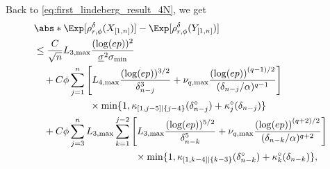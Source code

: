 \documentclass[aos]{imsart}
\begin{document}
\begin{appendix}
Back to \cref{eq:first_lindeberg_result_4N}, we get
\begin{equation*}
\begin{aligned}
    & \abs*{ \Exp[\rho_{r,\phi}^\delta(X_{[1,n]})] - \Exp[\rho_{r,\phi}^\delta(Y_{[1,n]})]} \\
    & \leq \frac{C}{\sqrt{n}} L_{3,\max} \frac{(\log(ep))^2}{\underline{\sigma}^2 \sigma_{\min}} \\
    & \quad + C \phi \sum_{j=1}^{n} \left[ 
        {L}_{4,\max} \frac{(\log(ep))^{3/2}}{\delta_{n-j}^3}
        + \nu_{q,\max} \frac{{(\log(ep))}^{(q-1)/2}}{(\delta_{n-j}/\alpha)^{q-1}}
    \right] \\
    & \quad \hspace{0.65in} \times \min\{1, \kappa_{[1,j-5]|\{j-4\}}(\delta_{n-j}^\circ) + \kappa^\circ_{j}(\delta_{n-j})\} \\
    & \quad + C \phi \sum_{j=3}^{n} 
    L_{3,\max} \sum_{k=1}^{j-2} \left[ 
        {L}_{3,\max} \frac{(\log(ep))^{5/2}}{\delta_{n-k}^5}
        + \nu_{q,\max} \frac{{(\log(ep))}^{(q+2)/2}}{(\delta_{n-k}/\alpha)^{q+2}}
    \right] \\
    & \quad \hspace{1.3in} \times \min\{1, \kappa_{[1,k-4]|\{k-3\}}(\delta_{n-k}^\circ) + \kappa^\circ_{k}(\delta_{n-k})\},
\end{aligned}
\end{equation*}





\end{appendix}
\end{document}
